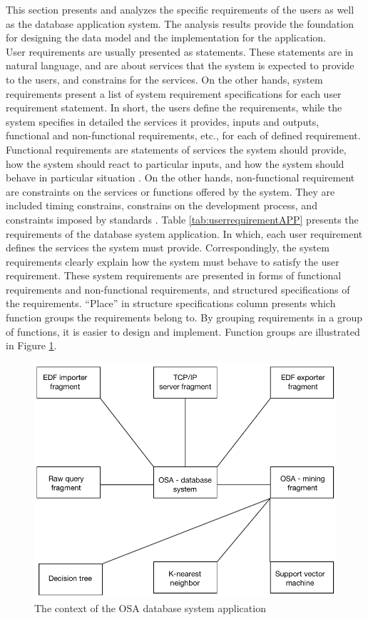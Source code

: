 This section presents and analyzes the specific requirements of the users as well as the database application system. The analysis results provide the foundation for designing the data model and the implementation for the application.\\
User requirements are usually presented as statements. These statements are in natural language, and are about services that the system is expected to provide to the users, and constrains for the services. On the other hands, system requirements present a list of system requirement specifications for each user requirement statement. In short, the users define the requirements, while the system specifies in detailed the services it provides, inputs and outputs, functional and non-functional requirements, etc., for each of defined requirement.\\
Functional requirements are statements of services the system should provide, how the system should react to particular inputs, and how the system should behave in particular situation \cite{INF1050BOOK}. On the other hands, non-functional requirement are constraints on the services or functions offered by the system. They are included timing constrains, constrains on the development process, and constraints imposed by standards \cite{INF1050BOOK}.
Table \ref{tab:userrequirementAPP} presents the requirements of the database system application. In which, each user requirement defines the services the system must provide. Correspondingly, the system requirements clearly explain how the system must behave to satisfy the user requirement. These system requirements are presented in forms of functional requirements and non-functional requirements, and structured specifications of the requirements. “Place” in structure specifications column presents which function groups the requirements belong to. By grouping requirements in a group of functions, it is easier to design and implement. Function groups are illustrated in Figure \ref{fig:Figures/OSADBSContext}.
\begin{figure}[ht]
    \centering
    \includegraphics[width=1.0\textwidth]{Figures/OSADBSContext.png}
    \caption{The context of the OSA database system application}
    \label{fig:Figures/OSADBSContext}
\end{figure}
